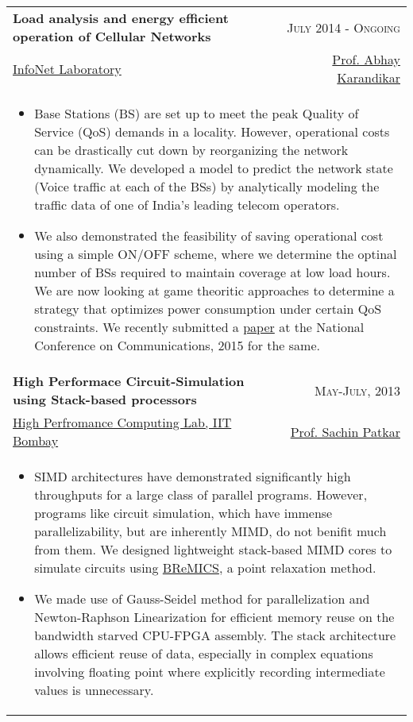 \documentclass[a4paper,8pt]{article} %
\begin{document}
{\begin{longtable}{lr}


\textbf{Load analysis and energy efficient operation of  Cellular Networks} & \textsc{July 2014 - Ongoing}\\
\href{https://www.ee.iitb.ac.in/~infonet/}{InfoNet Laboratory} & \href{https://www.ee.iitb.ac.in/wiki/faculty/karandi}{Prof. Abhay Karandikar}\\
\multicolumn{2}{p{16.5cm}}{
\begin{itemize}
	\item Base Stations (BS) are set up to meet the peak Quality of Service (QoS) demands in a locality. However, operational costs can be drastically cut down by reorganizing the network dynamically. We developed a model to predict the network state (Voice traffic at each of the BSs) by analytically modeling the traffic data of one of India's leading telecom operators. 
	\item We also demonstrated the feasibility of saving operational cost using a simple ON/OFF scheme, where we determine the optinal number of BSs required to maintain coverage at low load hours. We are now looking at game theoritic approaches to determine a strategy that optimizes power consumption under certain  QoS constraints. We recently submitted a  \href{http://www.ee.iitb.ac.in/student/~architgupta93/projects/desc/btp-paper.htm}{paper} at the National Conference on Communications, 2015 for the same.
\end{itemize}
}\\


\textbf{High Performace Circuit-Simulation using Stack-based processors} & \textsc{May-July, 2013}\\
\href{https://www.ee.iitb.ac.in/~hpc/}{High Perfromance Computing Lab, IIT Bombay} & \href{https://www.ee.iitb.ac.in/wiki/faculty/patkar}{Prof. Sachin Patkar}\\
\multicolumn{2}{p{16.5cm}}{
\begin{itemize}
	\item SIMD architectures have demonstrated significantly high throughputs for a large class of parallel programs. However, programs like circuit simulation, which have immense parallelizability, but are inherently MIMD, do not benifit much from them. We designed lightweight stack-based MIMD cores to simulate circuits using \href{https://www.ee.iitb.ac.in/vlsi/wb/slides/workshop3/bremics.pdf}{BReMICS}, a point relaxation method.
	\item We made use of Gauss-Seidel method for parallelization and Newton-Raphson Linearization for efficient memory reuse on the bandwidth starved CPU-FPGA assembly. The stack architecture allows efficient reuse of data, especially in complex equations involving floating point where explicitly recording intermediate values is unnecessary.  
\end{itemize}
}\\


\end{longtable}}
\end{document}
